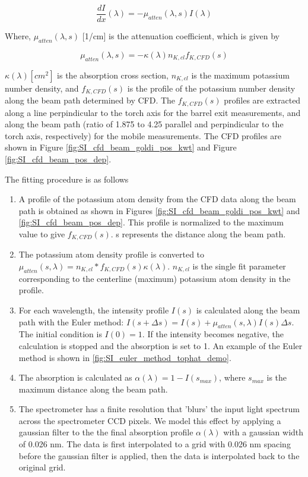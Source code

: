 \begin{equation}
    \frac{dI}{dx}(\lambda) = -\mu_{atten}(\lambda, s) I(\lambda)
\end{equation}

Where, $\mu_{atten} (\lambda, s)$ [1/cm] is the attenuation coefficient, which is given by 

\begin{equation}
    \mu_{atten}(\lambda, s) = -\kappa(\lambda) n_{K,cl} f_{K, CFD}(s)
\end{equation}

$\kappa(\lambda) [cm^2]$ is the absorption cross section, $n_{K,cl}$ is the maximum potassium number density, and $f_{K, CFD}(s)$ is the profile of the potassium number density along the beam path determined by CFD. The $f_{K, CFD}(s)$ profiles are extracted along a line perpindicular to the torch axis for the barrel exit measurements, and along the beam path (ratio of 1.875 to 4.25 parallel and perpindicular to the torch axis, respectively) for the mobile measurements. The CFD profiles are shown in Figure \ref{fig:SI_cfd_beam_goldi_pos_kwt} and Figure \ref{fig:SI_cfd_beam_pos_dep}.

The fitting procedure is as follows


\begin{enumerate}
    \item A profile of the potassium atom density from the CFD data along the beam path is obtained as shown in Figures \ref{fig:SI_cfd_beam_goldi_pos_kwt} and \ref{fig:SI_cfd_beam_pos_dep}. This profile is normalized to the maximum value to give $f_{K, CFD} (s)$. s represents the distance along the beam path.

    \item The potassium atom density profile is converted to $\mu_{atten} (s, \lambda) = n_{K, cl}* f_{K, CFD} (s) \kappa(\lambda)$. $n_{K, cl}$ is the single fit parameter corresponding to the centerline (maximum) potassium atom density in the profile.
    \item For each wavelength, the intensity profile $I(s)$ is calculated along the beam path with the Euler method: $I(s + \Delta s) = I(s) + \mu_{atten}(s, \lambda) I(s) \Delta s$. The initial condition is $I(0) = 1$. If the intensity becomes negative, the calculation is stopped and the absorption is set to 1. An example of the Euler method is shown in \ref{fig:SI_euler_method_tophat_demo}.
    \item The absorption is calculated as $\alpha(\lambda) = 1 - I(s_{max})$, where $s_{max}$ is the maximum distance along the beam path. 
    \item The spectrometer has a finite resolution that 'blurs' the input light spectrum across the spectrometer CCD pixels. We model this effect by applying a gaussian filter to the the final absorption profile $\alpha(\lambda)$ with a gaussian width of 0.026 nm. The data is first interpolated to a grid with 0.026 nm spacing before the gaussian filter is applied, then the data is interpolated back to the original grid.
\end{enumerate}

